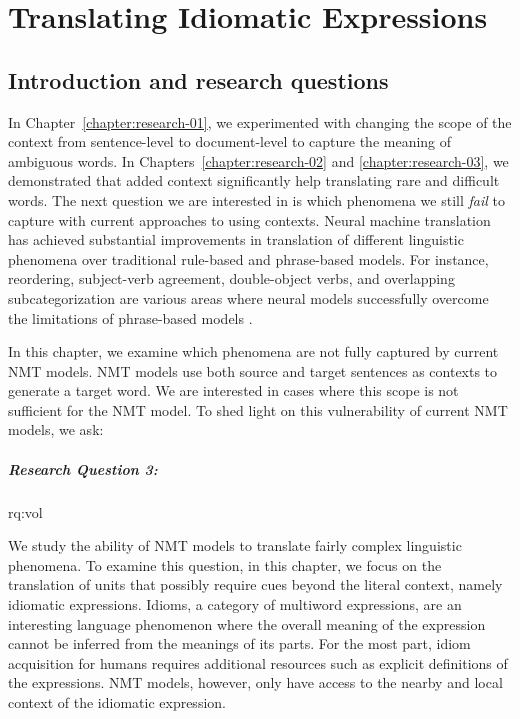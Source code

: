 
\chapter{Translating Idiomatic Expressions}
\label{chapter:research-04}

\section{Introduction and research questions}

In Chapter~\ref{chapter:research-01}, we experimented with changing the scope of the context from sentence-level to document-level to capture the meaning of ambiguous words. 
In Chapters~\ref{chapter:research-02} and \ref{chapter:research-03}, we demonstrated that added context significantly help translating rare and difficult words.
The next question we are interested in is which phenomena we still \textit{fail} to capture with current approaches to using contexts.
Neural machine translation has achieved substantial improvements in translation of different linguistic phenomena over traditional rule-based and phrase-based models. 
For instance, reordering, subject-verb agreement, double-object verbs, and overlapping subcategorization are various areas where neural models successfully overcome the limitations of phrase-based models \citep{isabelle2017challenge,bentivogli-EtAl:2016:EMNLP2016}.

In this chapter, we examine which phenomena are not fully captured by current NMT models.
NMT models use both source and target sentences as contexts to generate a target word.
We are interested in cases where this scope is not sufficient for the NMT model. 
To shed light on this vulnerability of current NMT models, we ask:

\paragraph{Research Question 3:} \acl{rq:vol} 

\medskip

 \noindent We study the ability of NMT models to translate fairly complex linguistic phenomena. 
To examine this question, in this chapter, we focus on the translation of units that possibly require cues beyond the literal context, namely idiomatic expressions. 
Idioms, a category of multiword expressions, are an interesting language phenomenon where the overall meaning of the expression cannot be inferred from the meanings of its parts.
For the most part, idiom acquisition for humans requires additional resources such as explicit definitions of the expressions.  
NMT models, however, only have access to the nearby and local context of the idiomatic expression. 

